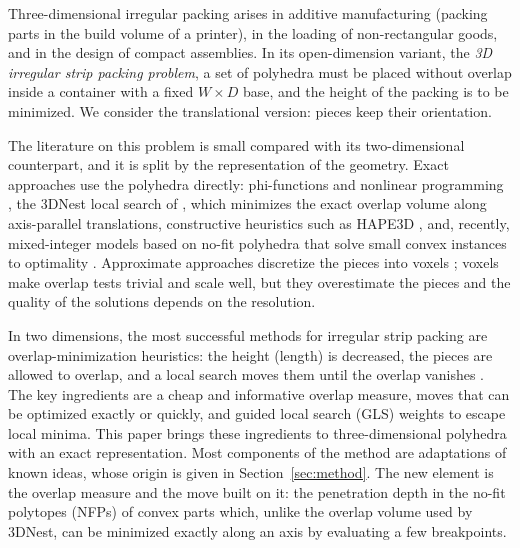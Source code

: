 \documentclass[preprint,12pt,authoryear]{elsarticle}
\begin{document}
Three-dimensional irregular packing arises in additive manufacturing (packing parts in the build volume of a
printer), in the loading of non-rectangular goods, and in the design of compact assemblies. In its open-dimension
variant, the \emph{3D irregular strip packing problem}, a set of polyhedra must be placed without overlap inside
a container with a fixed $W\times D$ base, and the height of the packing is to be minimized. We consider the
translational version: pieces keep their orientation.

The literature on this problem is small compared with its two-dimensional counterpart, and it is split by the
representation of the geometry. Exact approaches use the polyhedra directly: phi-functions and nonlinear
programming \citep{stoyan2004,stoyan2005,romanova2018}, the 3DNest local search of \citet{egeblad2009}, which
minimizes the exact overlap volume along axis-parallel translations, constructive heuristics such as HAPE3D
\citep{liu2015}, and, recently, mixed-integer models based on no-fit polyhedra that solve small convex instances
to optimality \citep{tollenaere2026}. Approximate approaches discretize the pieces into voxels
\citep{lamas2023}; voxels make overlap tests trivial and scale well, but they overestimate the pieces and the
quality of the solutions depends on the resolution.

In two dimensions, the most successful methods for irregular strip packing are overlap-minimization heuristics:
the height (length) is decreased, the pieces are allowed to overlap, and a local search moves them until the
overlap vanishes \citep{egeblad2007,umetani2009,imamichi2009,elkeran2013,gardeyn2025}. The key ingredients are a
cheap and informative overlap measure, moves that can be optimized exactly or quickly, and guided local search
(GLS) weights to escape local minima. This paper brings these ingredients to three-dimensional polyhedra with an
exact representation. Most components of the method are adaptations of known ideas, whose origin is given in
Section~\ref{sec:method}. The new element is the overlap measure and the move built on it: the penetration depth
in the no-fit polytopes (NFPs) of convex parts which, unlike the overlap volume used by 3DNest, can be minimized
exactly along an axis by evaluating a few breakpoints.
\end{document}
